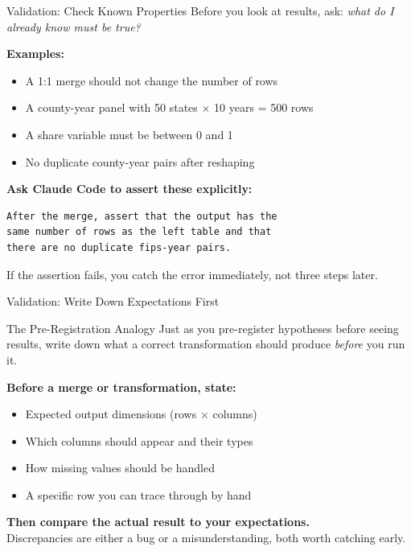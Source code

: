 \documentclass[aspectratio=169, 11pt]{beamer}
\begin{document}
\begin{frame}[fragile]{Validation: Check Known Properties}
  Before you look at results, ask: \textit{what do I already know must be true?}

  \vspace{0.5em}
  \textbf{Examples:}
  \begin{itemize}
    \item A 1:1 merge should not change the number of rows
    \item A county-year panel with 50 states $\times$ 10 years = 500 rows
    \item A share variable must be between 0 and 1
    \item No duplicate county-year pairs after reshaping
  \end{itemize}

  \vspace{0.5em}
  \textbf{Ask Claude Code to assert these explicitly:}
  \begin{lstlisting}
After the merge, assert that the output has the
same number of rows as the left table and that
there are no duplicate fips-year pairs.
  \end{lstlisting}

  If the assertion fails, you catch the error immediately, not three steps later.
\end{frame}

\begin{frame}{Validation: Write Down Expectations First}
  \begin{block}{The Pre-Registration Analogy}
    Just as you pre-register hypotheses before seeing results, write down what a correct transformation should produce \textit{before} you run it.
  \end{block}

  \vspace{0.5em}
  \textbf{Before a merge or transformation, state:}
  \begin{itemize}
    \item Expected output dimensions (rows $\times$ columns)
    \item Which columns should appear and their types
    \item How missing values should be handled
    \item A specific row you can trace through by hand
  \end{itemize}

  \vspace{0.5em}
  \textbf{Then compare the actual result to your expectations.}\\
  Discrepancies are either a bug or a misunderstanding, both worth catching early.
\end{frame}
\end{document}

